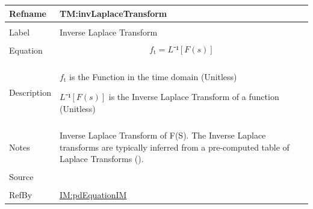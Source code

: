 \documentclass[12pt]{article}
\begin{document}
\begin{minipage}{\textwidth}
\begin{tabular}{>{\raggedright}p{}>{\raggedright\arraybackslash}p{}}
\toprule \textbf{Refname} & \textbf{TM:invLaplaceTransform}
\label{TM:invLaplaceTransform}
\\ \midrule \\
Label & Inverse Laplace Transform
        
\\ \midrule \\
Equation & \begin{displaymath}
           {f_{\text{t}}}=L⁻¹[F(s)]
           \end{displaymath}
\\ \midrule \\
Description & \begin{symbDescription}
              \item{${f_{\text{t}}}$ is the Function in the time domain (Unitless)}
              \item{$L⁻¹[F(s)]$ is the Inverse Laplace Transform of a function (Unitless)}
              \end{symbDescription}
\\ \midrule \\
Notes & Inverse Laplace Transform of F(S). The Inverse Laplace transforms are typically inferred from a pre-computed table of Laplace Transforms (\cite{laplaceWiki}).
        
\\ \midrule \\
Source & \cite{laplaceWiki}
         
\\ \midrule \\
RefBy & \hyperref[IM:pdEquationIM]{IM:pdEquationIM}
        
\\ \bottomrule
\end{tabular}
\end{minipage}
\vspace{\baselineskip}
\noindent
\end{document}
